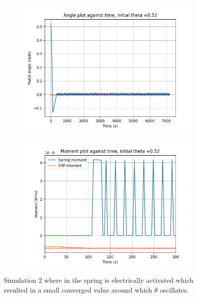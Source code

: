 \begin{figure}[!htb]
\centering
\begin{subfigure}{0.5\textwidth}
  \centering
  \includegraphics[width=1\linewidth]{images/second/theta_plot.png}
\end{subfigure}%
\begin{subfigure}{.5\textwidth}
  \centering
  \includegraphics[width=1\linewidth]{images/second/moment_plot.png}
\end{subfigure}
\caption{Simulation 2 where in the spring is electrically activated which resulted in a small converged value around which $\theta$ oscillates.}
\label{fig:2_results}
\end{figure}


